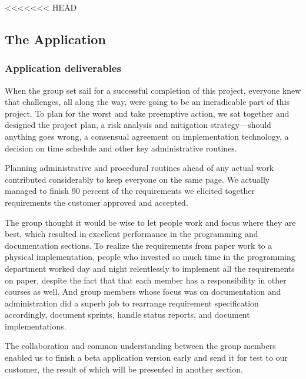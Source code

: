 <<<<<<< HEAD
\subsection{The Application}
    \subsubsection{Application deliverables}
    When the group set sail for a successful completion of this project, everyone knew that challenges, all along the way, were going to be an ineradicable part of this project. To plan for the worst and take preemptive action, we sat together and designed the project plan, a risk analysis and mitigation strategy---should anything goes wrong, a consensual agreement on implementation technology, a decision on time schedule and other key administrative routines.
    
    Planning administrative and procedural routines ahead of any actual work contributed considerably to keep everyone on the same page. We actually managed to finish 90 percent of the requirements we elicited together requirements the customer approved and accepted.
    
    The group thought it would be wise to let people work and focus where they are best, which resulted in excellent performance in the programming and documentation sections. To realize the requirements from paper work to a physical implementation, people who invested so much time in the programming department worked day and night relentlessly to implement all the requirements on paper, despite the fact that that each member has a responsibility in other courses as well. And group members whose focus was on documentation and administration did a superb job to rearrange requirement specification accordingly, document sprints, handle status reports, and document implementations.
    
    The collaboration and common understanding between the group members enabled us to finish a beta application version early and send it for test to our customer, the result of which will be presented in another section.
    
